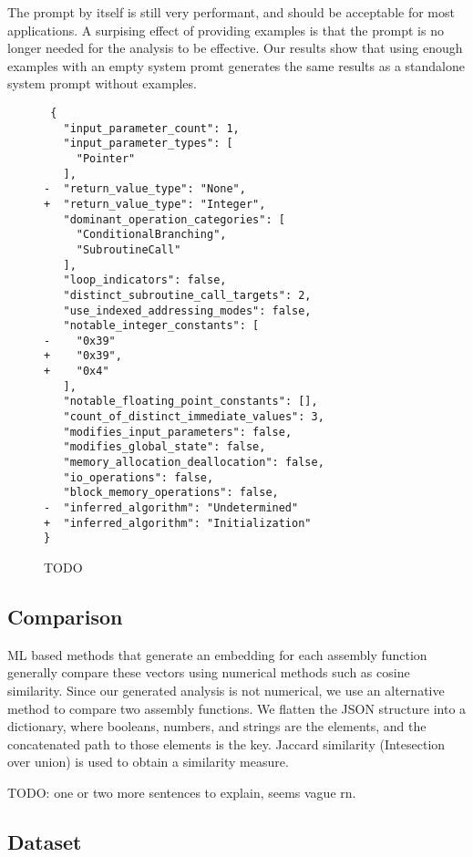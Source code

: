 \documentclass[conference,compsoc]{IEEEtran}
\begin{document}
The prompt by itself is still very performant, and should be acceptable for most applications. A surpising effect of providing examples
is that the prompt is no longer needed for the analysis to be effective. Our results show that using enough examples with an empty system promt
generates the same results as a standalone system prompt without examples.

\begin{figure}[ht]
\centering
\begin{minipage}{0.95\linewidth}
\begin{verbatim}
 {
   "input_parameter_count": 1,
   "input_parameter_types": [
     "Pointer"
   ],
-  "return_value_type": "None",
+  "return_value_type": "Integer",
   "dominant_operation_categories": [
     "ConditionalBranching",
     "SubroutineCall"
   ],
   "loop_indicators": false,
   "distinct_subroutine_call_targets": 2,
   "use_indexed_addressing_modes": false,
   "notable_integer_constants": [
-    "0x39"
+    "0x39",
+    "0x4"
   ],
   "notable_floating_point_constants": [],
   "count_of_distinct_immediate_values": 3,
   "modifies_input_parameters": false,
   "modifies_global_state": false,
   "memory_allocation_deallocation": false,
   "io_operations": false,
   "block_memory_operations": false,
-  "inferred_algorithm": "Undetermined"
+  "inferred_algorithm": "Initialization"
}
\end{verbatim}
\caption{TODO}
\label{feature-diff}
\end{minipage}
\end{figure}

\subsection{Comparison}

ML based methods that generate an embedding for each assembly function generally compare these vectors using numerical
methods such as cosine similarity.  Since our generated analysis is not numerical, we use an alternative
method to compare two assembly functions.  We flatten the JSON structure into a dictionary, where booleans, numbers, and
strings are the elements, and the concatenated path to those elements is the key.  Jaccard similarity (Intesection over union)
is used to obtain a similarity measure.

TODO: one or two more sentences to explain, seems vague rn.

\subsection{Dataset}
\end{document}
